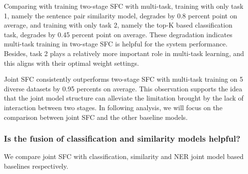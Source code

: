 \begin{table}
  \begin{centering}
    \par
  \end{centering}
  \caption{The average classification accuracy in percentage in stage 1 on all five dataset.}
  \label{tbe:top1_5_accuracy}
\end{table}

Comparing with training two-stage SFC with multi-task, training with only task
1,  namely the sentence pair similarity model, degrades by 0.8 percent
point  on average, and training with only task 2, namely the top-K based
classification  task,  degrades  by  0.45  percent  point  on  average.  These
degradation  indicates  multi-task training in two-stage SFC is helpful for the
system  performance.  Besides, task 2 plays a relatively more important role in
multi-task learning, and this aligns with their optimal weight settings.

Joint SFC consistently outperforms two-stage SFC with multi-task training  
on 5 diverse datasets by 0.95 percents  on  average. 
This observation supports the idea that the joint model
structure  can  alleviate  the  limitation  brought by the lack of interaction
between  two  stages.  In  following analysis, we will focus on the comparison
between joint SFC and the other baseline models.

\subsubsection*{Is  the  fusion of classification and similarity models
helpful?}  We  compare  joint SFC with classification, similarity and NER joint model based baselines respectively.

